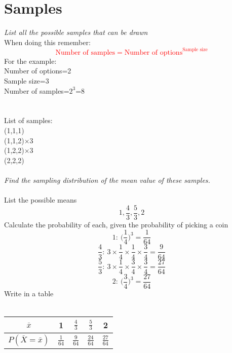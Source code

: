 \documentclass{article}[18pt]
\begin{document}
\section{Samples}
\textit{List all the possible samples that can be drawn}\\
When doing this remember:
\textcolor{red}{$$\textrm{Number of samples}=\textrm{Number of options}^\textrm{Sample size}$$}
For the example:\\
Number of options=2\\
Sample size=3\\
Number of samples=$2^3$=8\\
\\
\\
List of samples:\\
(1,1,1)\\
(1,1,2)$\times$3\\
(1,2,2)$\times$3\\
(2,2,2)\\
\\
\textit{Find the sampling distribution of the mean value of these samples.}\\
\\
List the possible means
$$1,\frac{4}{3},\frac{5}{3},2$$
Calculate the probability of each, given the probability of picking a coin
$$1: \ \Bigg(\frac{1}{4}\Bigg)^3=\frac{1}{64}$$
$$\frac{4}{3}: \ 3\times\frac{1}{4}\times\frac{1}{4}\times\frac{3}{4}=\frac{9}{64}$$
$$\frac{5}{3}: \ 3\times\frac{1}{4}\times\frac{3}{4}\times\frac{3}{4}=\frac{27}{64}$$
$$2: \ \Bigg(\frac{3}{4}\Bigg)^3=\frac{27}{64}$$
Write in a table\\
\\
{\renewcommand{\arraystretch}{1.5}
\begin{tabular}{|c|c|c|c|c|}
\hline
$\overline{x}$&1&$\frac{4}{3}$&$\frac{5}{3}$&2\\
\hline
$P(\overline{X}=\overline{x})$&$\frac{1}{64}$&$\frac{9}{64}$&$\frac{24}{64}$&$\frac{27}{64}$\\
\hline

\end{tabular}}
\end{document}

